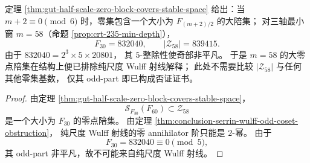 \begin{corollary}[三轴最小窗 \texorpdfstring{$m=58$}{m=58} 的 odd-part 证书]\label{cor:conclusion-serrin-wulff-m58-odd-part-certificate}
定理 \ref{thm:gut-half-scale-zero-block-covers-stable-space} 给出：当
\(m+2\equiv 0\pmod 6\)
时，零集包含一个大小为 \(F_{(m+2)/2}\) 的大陪集；
对三轴最小窗 \(m=58\)（命题 \ref{prop:crt-235-min-depth}），
\[
F_{30}=832040,
\qquad
|\mathcal Z_{58}|=839415.
\]
由于
\(832040=2^3\times 5\times 20801\)，
其 \(5\)-整除性使奇部非平凡。
于是 \(m=58\) 的大零点陪集在结构上便已排除纯尺度 Wulff 射线解释；
此处不需要比较 \(|\mathcal Z_{58}|\) 与任何其他零集基数，
仅其 odd-part 即已构成否证证书。
\end{corollary}
\begin{proof}
由定理 \ref{thm:gut-half-scale-zero-block-covers-stable-space}，
\[
\mathcal S_{F_{30}}(F_{60})\subset \mathcal Z_{58}
\]
是一个大小为 \(F_{30}\) 的零点陪集。
由定理 \ref{thm:conclusion-serrin-wulff-odd-coset-obstruction}，
纯尺度 Wulff 射线的零 annihilator 阶只能是 \(2\)-幂。
由于
\[
F_{30}=832040\equiv 0\pmod 5,
\]
其 odd-part 非平凡，故不可能来自纯尺度 Wulff 射线。
\end{proof}

